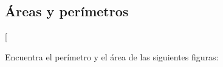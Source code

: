 \documentclass[12pt,addpoints]{repaso}
\begin{document}
\begin{questions}

    \subsection*{Áreas y perímetros}

    \ejemplosboxed[{Encuentra el perímetro y el área de las siguientes figuras:

                \begin{multicols}{2}
\end{multicols}}
\end{questions}
\end{document}
